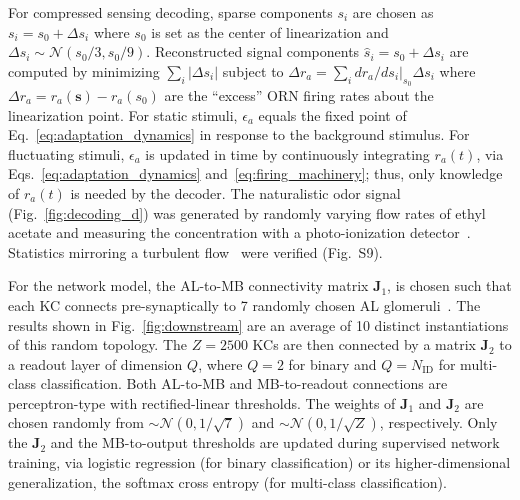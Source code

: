 \documentclass[10pt,prl,aps,showpacs,twocolumn,unsortedaddress]{revtex4-1}
\begin{document}
For compressed sensing decoding, sparse components $s_i$ are chosen as $s_i = s_0 + \Delta s_i$ where $s_0$ is set as the center of linearization and $\Delta s_i \sim \mathcal {N} (s_0/3, s_0/9)$. Reconstructed signal components $\hat {s} _i = s_0 + \Delta s_i$ are computed by minimizing $\sum_i |\Delta s_i|$ subject to $\Delta r_a = \sum_i dr_a/ds_i\big|_{s_0}\Delta  s_i$ where $\Delta r_a = r_a(\mathbf s) -  r_a(s_0)$ are the ``excess” ORN firing rates about the linearization point. For static stimuli, $\epsilon_a$ equals the fixed point of Eq.~\ref{eq:adaptation_dynamics} in response to the background stimulus. For fluctuating stimuli, $\epsilon_a$ is updated in time by continuously integrating  $r_a(t)$, via Eqs.~\ref{eq:adaptation_dynamics} and~\ref{eq:firing_machinery}; thus, only knowledge of $r_a(t)$ is needed by the decoder.
The naturalistic odor signal (Fig.~\ref{fig:decoding_d}) was generated by randomly varying flow rates of ethyl acetate and measuring the concentration with a photo-ionization detector~\cite{srinivas_elife}. Statistics mirroring a turbulent flow~\cite{celani} were verified (Fig.~S9).

For the network model, the AL-to-MB connectivity matrix $\mathbf {J}_1$, is chosen such that  each KC connects pre-synaptically to 7 randomly chosen AL glomeruli~\cite{litwinkumar,abbott_axel}. The results shown in Fig.~\ref{fig:downstream} are an average of 10 distinct instantiations of this random topology. The $Z=2500$ KCs are then connected by a matrix $\mathbf J_2$ to a readout layer of dimension $Q$, where $Q=2$ for binary and $Q=N_{\text{ID}}$ for multi-class classification. Both AL-to-MB and MB-to-readout connections are perceptron-type with rectified-linear thresholds. The weights of $\mathbf J_1$ and $\mathbf J_2$ are chosen randomly from $\sim \mathcal{N}(0, 1/\sqrt{7})$ and $\sim \mathcal{N}(0, 1/\sqrt{Z})$, respectively. Only the $\mathbf J_2$ and the MB-to-output thresholds are updated during supervised network training, via logistic regression (for binary classification) or its higher-dimensional generalization, the softmax cross entropy (for multi-class classification).

\end{document}
